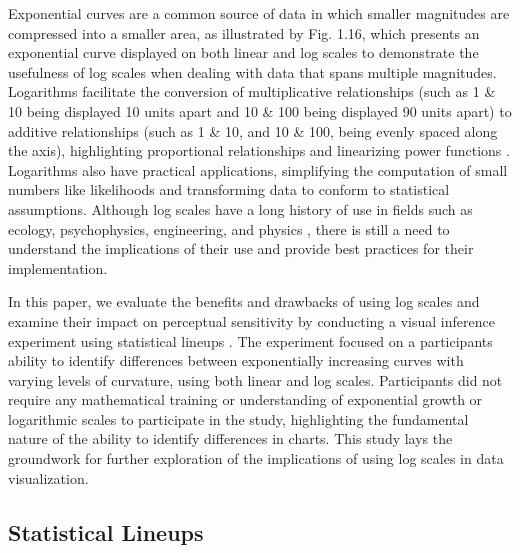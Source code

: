 \documentclass[12pt]{article}
\begin{document}
Exponential curves are a common source of data in which smaller
magnitudes are compressed into a smaller area, as illustrated by Fig.
1.16, which presents an exponential curve displayed on both linear and
log scales to demonstrate the usefulness of log scales when dealing with
data that spans multiple magnitudes. Logarithms facilitate the
conversion of multiplicative relationships (such as 1 \& 10 being
displayed 10 units apart and 10 \& 100 being displayed 90 units apart)
to additive relationships (such as 1 \& 10, and 10 \& 100, being evenly
spaced along the axis), highlighting proportional relationships and
linearizing power functions \citep{menge_logarithmic_2018}. Logarithms
also have practical applications, simplifying the computation of small
numbers like likelihoods and transforming data to conform to statistical
assumptions. Although log scales have a long history of use in fields
such as ecology, psychophysics, engineering, and physics
\citep{heckler_student_2013, waddell2005comparisons}, there is still a
need to understand the implications of their use and provide best
practices for their implementation.

In this paper, we evaluate the benefits and drawbacks of using log
scales and examine their impact on perceptual sensitivity by conducting
a visual inference experiment using statistical lineups
\citep{buja_statistical_2009}. The experiment focused on a participants
ability to identify differences between exponentially increasing curves
with varying levels of curvature, using both linear and log scales.
Participants did not require any mathematical training or understanding
of exponential growth or logarithmic scales to participate in the study,
highlighting the fundamental nature of the ability to identify
differences in charts. This study lays the groundwork for further
exploration of the implications of using log scales in data
visualization.

\hypertarget{statistical-lineups}{%
\subsection{Statistical Lineups}\label{statistical-lineups}}
\end{document}
